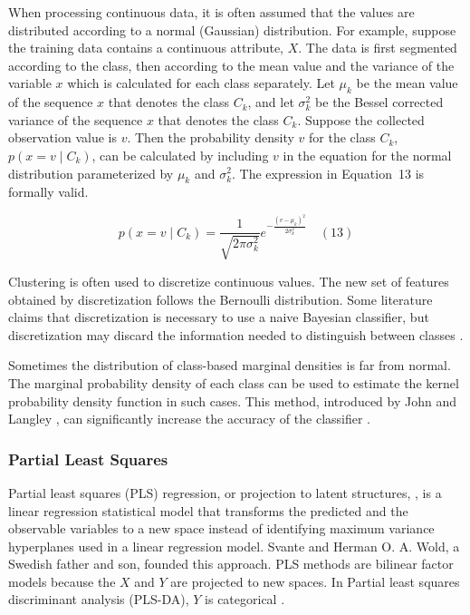 \documentclass[preprint,12pt]{elsarticle}
\begin{document}
When processing continuous data, it is often assumed that the values are distributed according to a normal (Gaussian) distribution. For example, suppose the training data contains a continuous attribute, $X$. The data is first segmented according to the class, then according to the mean value and the variance of the variable $x$ which is calculated for each class separately. Let $\mu_{k}$ be the mean value of the sequence $x$ that denotes the class $C_{k}$, and let $\sigma_{k}^{2}$ be the Bessel corrected variance of the sequence $x$ that denotes the class $C_{k}$. Suppose the collected observation value is $v$. Then the probability density $v$ for the class $C_{k}$, $p(x=v\mid C_{k})$, can be calculated by including $v$ in the equation for the normal distribution parameterized by $\mu_{k}$ and $\sigma_{k}^{2}$. The expression in Equation~13 is formally valid.

\begin{equation}
	p(x=v\mid C_{k}) = \frac{1}{\sqrt{2\pi \sigma_{k}^{2}}} e^{-\frac{{(v-\mu_{k})}^{2}}{2\sigma_{k}^{2}}}
	\quad\left(13\right)
\end{equation}

Clustering is often used to discretize continuous values. The new set of features obtained by discretization follows the Bernoulli distribution. Some literature claims that discretization is necessary to use a naive Bayesian classifier, but discretization may discard the information needed to distinguish between classes \cite{Hand2001}.

Sometimes the distribution of class-based marginal densities is far from normal. The marginal probability density of each class can be used to estimate the kernel probability density function in such cases. This method, introduced by John and Langley \cite{John2013}, can significantly increase the accuracy of the classifier \cite{Piryonesi2020, Hastie2009}.

\subsubsection{Partial Least Squares}

Partial least squares (PLS) regression, or projection to latent structures, \cite{wold2001pls, abdi2010partial}, is a linear regression statistical model that transforms the predicted and the observable variables to a new space instead of identifying maximum variance hyperplanes used in a linear regression model. Svante and Herman O. A. Wold, a Swedish father and son, founded this approach. PLS methods are bilinear factor models because the $X$ and $Y$ are projected to new spaces. In Partial least squares discriminant analysis (PLS-DA), $Y$ is categorical \cite{saebo2008lpls}.
\end{document}
